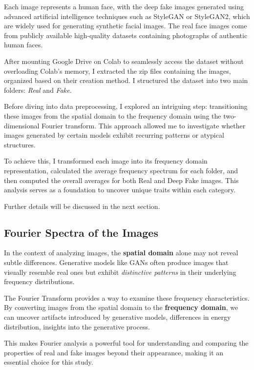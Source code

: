 \documentclass[12pt]{article}
\begin{document}
Each image represents a human face, with the deep fake images generated
using advanced artificial intelligence techniques such as StyleGAN or
StyleGAN2, which are widely used for generating synthetic facial images.
The real face images come from publicly available high-quality datasets
containing photographs of authentic human faces.

    After mounting Google Drive on Colab to seamlessly access the dataset
without overloading Colab's memory, I extracted the zip files containing
the images, organized based on their creation method. I structured the
dataset into two main folders: \emph{Real} and \emph{Fake}.

Before diving into data preprocessing, I explored an intriguing step:
transitioning these images from the spatial domain to the frequency
domain using the two-dimensional Fourier transform. This approach
allowed me to investigate whether images generated by certain models
exhibit recurring patterns or atypical structures.

To achieve this, I transformed each image into its frequency domain
representation, calculated the average frequency spectrum for each
folder, and then computed the overall averages for both Real and Deep
Fake images. This analysis serves as a foundation to uncover unique
traits within each category.

Further details will be discussed in the next section.

    \subsection{Fourier Spectra of the
Images}\label{fourier-spectra-of-the-images}

    In the context of analyzing images, the \textbf{spatial domain} alone
may not reveal subtle differences. Generative models like GANs often
produce images that visually resemble real ones but exhibit
\emph{distinctive patterns} in their underlying frequency distributions.

The Fourier Transform provides a way to examine these frequency
characteristics. By converting images from the spatial domain to the
\textbf{frequency domain}, we can uncover artifacts introduced by
generative models, differences in energy distribution, insights into the
generative process.

This makes Fourier analysis a powerful tool for understanding and
comparing the properties of real and fake images beyond their
appearance, making it an essential choice for this study.
\end{document}
